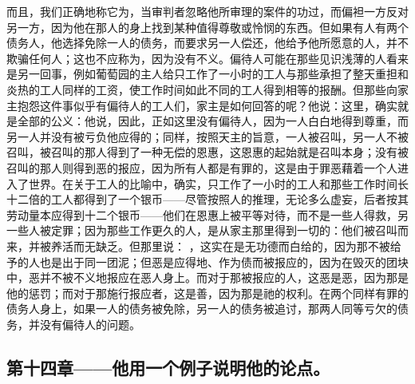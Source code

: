 而且，我们正确地称它为，当审判者忽略他所审理的案件的功过，而偏袒一方反对另一方，因为他在那人的身上找到某种值得尊敬或怜悯的东西。但如果有人有两个债务人，他选择免除一人的债务，而要求另一人偿还，他给予他所愿意的人，并不欺骗任何人；这也不应称为，因为没有不义。偏待人可能在那些见识浅薄的人看来是另一回事，例如葡萄园的主人给只工作了一小时的工人与那些承担了整天重担和炎热的工人同样的工资，使工作时间如此不同的工人得到相等的报酬。但那些向家主抱怨这件事似乎有偏待人的工人们，家主是如何回答的呢？他说：这里，确实就是全部的公义：他说，因此，正如这里没有偏待人，因为一人白白地得到尊重，而另一人并没有被亏负他应得的；同样，按照天主的旨意，一人被召叫，另一人不被召叫，被召叫的那人得到了一种无偿的恩惠，这恩惠的起始就是召叫本身；没有被召叫的那人则得到恶的报应，因为所有人都是有罪的，这是由于罪恶藉着一个人进入了世界。在关于工人的比喻中，确实，只工作了一小时的工人和那些工作时间长十二倍的工人都得到了一个银币——尽管按照人的推理，无论多么虚妄，后者按其劳动量本应得到十二个银币——他们在恩惠上被平等对待，而不是一些人得救，另一些人被定罪；因为那些工作更久的人，是从家主那里得到一切的：他们被召叫而来，并被养活而无缺乏。但那里说：   ，这实在是无功德而白给的，因为那不被给予的人也是出于同一团泥；但恶是应得地、作为债而被报应的，因为在毁灭的团块中，恶并不被不义地报应在恶人身上。而对于那被报应的人，这恶是恶，因为那是他的惩罚；而对于那施行报应者，这是善，因为那是祂的权利。在两个同样有罪的债务人身上，如果一人的债务被免除，另一人的债务被追讨，那两人同等亏欠的债务，并没有偏待人的问题。\par


\subsection{第十四章——他用一个例子说明他的论点。}

